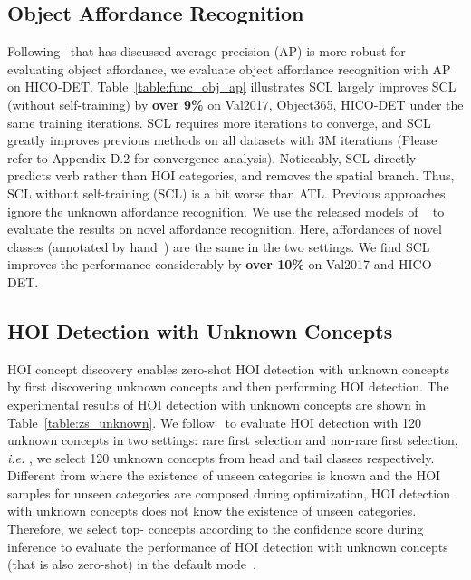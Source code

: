 \documentclass[runningheads]{llncs}
\newcommand{\ie}{\textit{i.e. }}
\begin{document}
\subsection{Object Affordance Recognition}
\label{sec:affordance}

Following~\cite{hou2021atl} that has discussed average precision (AP) is more robust for evaluating object affordance, we evaluate object affordance recognition with AP on HICO-DET. Table~\ref{table:func_obj_ap} illustrates SCL largely improves SCL (without self-training) by {\bf over 9\%} on Val2017, Object365, HICO-DET under the same training iterations. SCL requires more iterations to converge, and SCL greatly improves previous methods on all datasets with 3M iterations (Please refer to Appendix D.2 for convergence analysis). Noticeably, SCL directly predicts verb rather than HOI categories, and removes the spatial branch. Thus, SCL without self-training (SCL) is a bit worse than ATL. Previous approaches ignore the unknown affordance recognition. We use the released models of ~\cite{hou2021atl} to evaluate the results on novel affordance recognition. Here, affordances of novel classes (annotated by hand~\cite{hou2021atl}) are the same in the two settings. We find SCL improves the performance considerably by {\bf over 10\%} on Val2017 and HICO-DET.




\subsection{HOI Detection with Unknown Concepts}

HOI concept discovery enables zero-shot HOI detection with unknown concepts by first discovering unknown concepts and then performing HOI detection. The experimental results of HOI detection with unknown concepts are shown in Table~\ref{table:zs_unknown}. We follow~\cite{hou2020visual} to evaluate HOI detection with 120 unknown concepts in two settings: rare first selection and non-rare first selection, \ie, we select 120 unknown concepts from head and tail classes respectively. Different from \cite{hou2020visual,hou2021fcl} where the existence of unseen categories is known and the HOI samples for unseen categories are composed during optimization, HOI detection with unknown concepts does not know the existence of unseen categories. Therefore, we select top- concepts according to the confidence score during inference to evaluate the performance of HOI detection with unknown concepts (that is also zero-shot) in the default mode~\cite{chao2018learning}.
\end{document}
